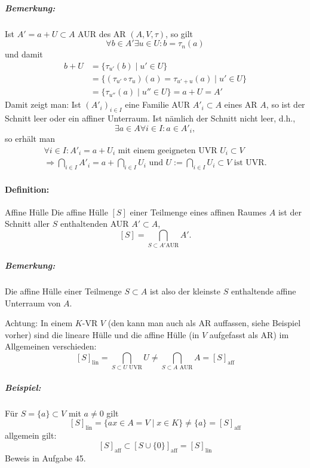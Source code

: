 
\subparagraph{Bemerkung: }
	Ist $ A' = a+U\subset A $ AUR des AR $ (A,V,\tau) $, so gilt
		\[ \forall b\in A'\exists u\in U:b=\tau_n(a)\]
	und damit
	\begin{align*}
		b+U&=\{\tau_{u'}(b)\mid u'\in U\}\\
		&=\{(\tau_{u'}\circ \tau_u)(a)=\tau_{u'+u}(a)\mid u'\in U\}\\
		&= \{\tau_{u''}(a)\mid u'' \in U\} = a+U = A'
	\end{align*}
	Damit zeigt man: Ist $ (A'_i)_{i\in I} $ eine Familie AUR $ A'_i\subset A $ eines AR $ A $, so ist der Schnitt leer oder ein affiner Unterraum. Ist nämlich der Schnitt nicht leer, d.h.,
	\[ \exists a\in A\forall i\in I:a\in A'_i, \]
	so erhält man
	\begin{gather*}
		\forall i\in I:A'_i = a+U_i \text{ mit einem geeigneten UVR } U_i\subset V\\
		\Rightarrow \bigcap_{i\in I}A'_i = a+\bigcap_{i\in I}U_i \text{ und } U:= \bigcap_{i\in I}U_i\subset V \text{ ist UVR.}
	\end{gather*}
\paragraph{Definition: }
	\begin{Definition}{Affine Hülle}
		Die affine Hülle $ [S] $ einer Teilmenge eines affinen Raumes $ A $ ist der Schnitt aller $ S $ enthaltenden AUR $ A'\subset A $,
		\[ [S] = \bigcap_{S\subset A' \text{AUR}}A'. \]
	\end{Definition}
\subparagraph{Bemerkung: }
	Die affine Hülle einer Teilmenge $ S\subset A $ ist also der kleinste $ S $ enthaltende affine Unterraum von $ A $.
	
	Achtung: In einem $ K $-VR $ V $ (den kann man auch als AR auffassen, siehe Beispiel vorher) sind die lineare Hülle und die affine Hülle (in $ V $ aufgefasst als AR) im Allgemeinen verschieden:
		\[ [S]_{\text{lin}} = \bigcap_{S\subset U\text{ UVR}}U \neq \bigcap_{S\subset A \text{ AUR}}A = [S]_{\text{aff}} \]
\subparagraph{Beispiel: }
	Für $ S=\{a\}\subset V $ mit $ a\neq 0 $ gilt
		\[ [S]_{\text{lin}} = \{ax\in A = V\mid x\in K\} \neq \{a\} = [S]_{\text{aff}} \]
	allgemein gilt:
		\[ [S]_{\text{aff}}\subset [S\cup \{0\}]_{\text{aff}}=[S]_{\text{lin}} \]
	Beweis in Aufgabe 45.
